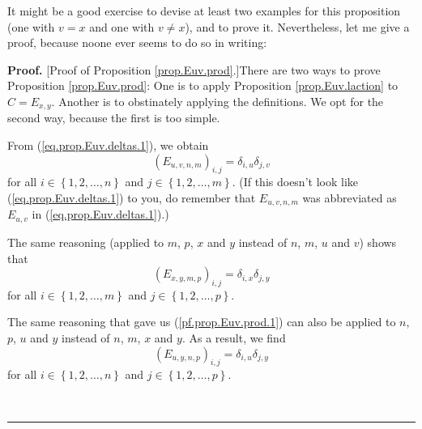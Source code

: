 \documentclass[numbers=enddot,12pt,final,onecolumn,notitlepage]{scrartcl}%
\theoremstyle{definition}
\newenvironment{proof}[1][Proof]{\noindent\textbf{#1.} }{\ \rule{0.5em}{0.5em}}
\begin{document}
It might be a good exercise to devise at least two examples for this
proposition (one with $v=x$ and one with $v\neq x$), and to prove it.
Nevertheless, let me give a proof, because noone ever seems to do so in writing:

\begin{proof}
[Proof of Proposition \ref{prop.Euv.prod}.]There are two ways to prove
Proposition \ref{prop.Euv.prod}: One is to apply Proposition
\ref{prop.Euv.laction} to $C=E_{x,y}$. Another is to obstinately applying the
definitions. We opt for the second way, because the first is too simple.

From (\ref{eq.prop.Euv.deltas.1}), we obtain%
\begin{equation}
\left(  E_{u,v,n,m}\right)  _{i,j}=\delta_{i,u}\delta_{j,v}
\label{pf.prop.Euv.prod.1}%
\end{equation}
for all $i\in\left\{  1,2,\ldots,n\right\}  $ and $j\in\left\{  1,2,\ldots
,m\right\}  $. (If this doesn't look like (\ref{eq.prop.Euv.deltas.1}) to you,
do remember that $E_{u,v,n,m}$ was abbreviated as $E_{u,v}$ in
(\ref{eq.prop.Euv.deltas.1}).)

The same reasoning (applied to $m$, $p$, $x$ and $y$ instead of $n$, $m$, $u$
and $v$) shows that%
\begin{equation}
\left(  E_{x,y,m,p}\right)  _{i,j}=\delta_{i,x}\delta_{j,y}
\label{pf.prop.Euv.prod.2}%
\end{equation}
for all $i\in\left\{  1,2,\ldots,m\right\}  $ and $j\in\left\{  1,2,\ldots
,p\right\}  $.

The same reasoning that gave us (\ref{pf.prop.Euv.prod.1}) can also be applied
to $n$, $p$, $u$ and $y$ instead of $n$, $m$, $x$ and $y$. As a result, we
find%
\begin{equation}
\left(  E_{u,y,n,p}\right)  _{i,j}=\delta_{i,u}\delta_{j,y}
\label{pf.prop.Euv.prod.3}%
\end{equation}
for all $i\in\left\{  1,2,\ldots,n\right\}  $ and $j\in\left\{  1,2,\ldots
,p\right\}  $.


\end{proof}
\end{document}
